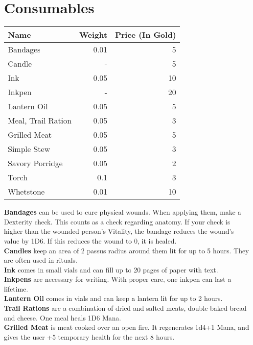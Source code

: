 \section{Consumables}
\begin{longtable}{l | r | r}
	Name & Weight & Price (In Gold)\\ \hline
	Bandages & 0.01 & 5\\
	Candle & - & 5\\
	Ink & 0.05 & 10\\
	Inkpen & - & 20\\
	Lantern Oil & 0.05 & 5\\
	Meal, Trail Ration & 0.05 & 3\\
	Grilled Meat & 0.05 & 5\\
	Simple Stew & 0.05 & 3\\
	Savory Porridge & 0.05 & 2\\
	Torch & 0.1 & 3\\
	Whetstone & 0.01 & 10\\
\end{longtable}


\textbf{Bandages} can be used to cure physical wounds. When applying them, make a Dexterity check. This counts as a check regarding anatomy. If your check is higher than the wounded person's Vitality, the bandage reduces the wound's value by 1D6. If this reduces the wound to 0, it is healed.\\


\textbf{Candles} keep an area of 2 passus radius around them lit for up to 5 hours. They are often used in rituals.\\


\textbf{Ink} comes in small vials and can fill up to 20 pages of paper with text.\\


\textbf{Inkpens} are necessary for writing. With proper care, one inkpen can last a lifetime.\\


\textbf{Lantern Oil} comes in vials and can keep a lantern lit for up to 2 hours.\\


\textbf{Trail Rations} are a combination of dried and salted meats, double-baked bread and cheese. One meal heals 1D6 Mana.\\


\textbf{Grilled Meat} is meat cooked over an open fire. It regenerates 1d4+1 Mana, and gives the user +5 temporary health for the next 8 hours.\\


